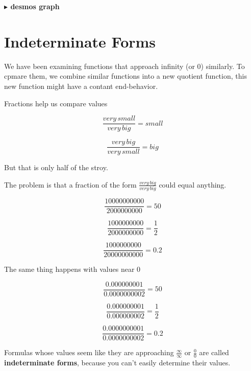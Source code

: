 \documentclass{ximera}
\begin{document}
\begin{onlineOnly}
\textbf{\textcolor{blue!55!black}{$\blacktriangleright$ desmos graph}} 
\begin{center}
\end{center}
\end{onlineOnly}





\section*{Indeterminate Forms}


We have been examining functions that approach infinity (or $0$) similarly. To cpmare them, we combine similar functions into a new quotient function, this new function might have a contant end-behavior. 


Fractions help us compare values


\[ \frac{very \, small}{very \, big} = small\]

\[ \frac{very \, big}{very \, small} = big\]



But that is only half of the stroy.


The problem is that a fraction of the form $\frac{very \, big}{very \, big}$ could equal anything.



\[  \frac{10000000000}{2000000000} = 50      \]

\[  \frac{1000000000}{2000000000} = \frac{1}{2}      \]

\[  \frac{1000000000}{20000000000} = 0.2      \]





The same thing happens with values near $0$


\[  \frac{0.000000001}{0.0000000002} = 50      \]

\[  \frac{0.000000001}{0.000000002} = \frac{1}{2}      \]

\[  \frac{0.0000000001}{0.0000000002} = 0.2      \]





Formulas whose values seem like they are approaching $\frac{\infty}{\infty}$ or $\frac{0}{0}$ are called \textbf{indeterminate forms}, because you can't easily determine their values.
\end{document}
